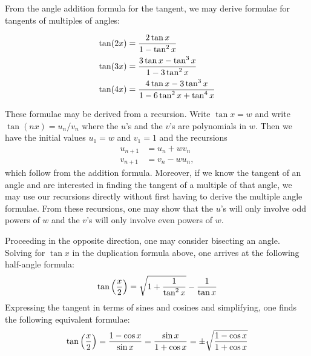 \documentclass[12pt]{article}
\begin{document}
From the angle addition formula for the tangent, we may derive formulae
for tangents of multiples of angles:

\begin{align*}
\tan (2x) &= {2 \tan x \over 1 - \tan^2 x} \\
\tan (3x) &= {3 \tan x - \tan^3 x \over 1 - 3 \tan^2 x} \\
\tan (4x) &= {4 \tan x - 3 \tan^3 x \over 1 - 6 \tan^2 x + \tan^4 x}
\end{align*}

These formulae may be derived from a recursion.  Write $\tan x = w$ and
write $\tan (nx) = u_n / v_n$ where the $u$'s and the $v$'s are
polynomials in $w$.  Then we have the initial values $u_1 = w$ and 
$v_1 = 1$ and the recursions
\begin{align*}
u_{n+1} &= u_n + w v_n \\
v_{n+1} &= v_n - w u_n ,
\end{align*}
which follow from the addition formula.  Moreover, if we know the tangent
of an angle and are interested in finding the tangent of a multiple of
that angle, we may use our recursions directly without first having to derive 
the multiple angle formulae.  From these recursions, one may show that the
$u$'s will only involve odd powers of $w$ and the $v$'s will only involve
even powers of $w$.

Proceeding in the opposite direction, one may consider bisecting an angle.
Solving for $\tan x$ in the duplication formula above, one arrives at the
following half-angle formula:
\[
\tan \left( {x \over 2} \right) =
\sqrt{ 1 + {1 \over \tan^2 x}} - {1 \over \tan x}
\]
Expressing the tangent in terms of sines and cosines and simplifying, one 
finds the following equivalent formulae:
\[
\tan \left( {x \over 2} \right) =
{1 - \cos x \over \sin x} =
{\sin x \over 1 + \cos x} =
\pm\sqrt{ 1 - \cos x \over 1 + \cos x }
\]
\end{document}
